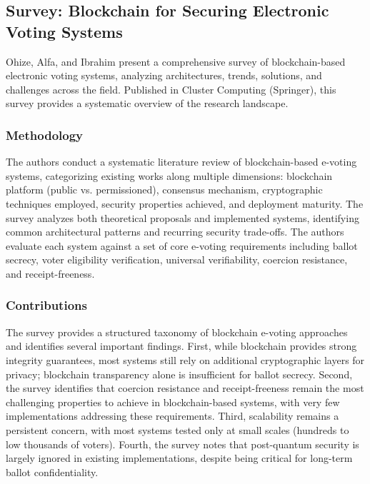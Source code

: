 \subsection{Survey: Blockchain for Securing Electronic Voting Systems}
\label{subsec:survey}

Ohize, Alfa, and Ibrahim \cite{evoting_survey_springer} present a comprehensive survey of blockchain-based electronic voting systems, analyzing architectures, trends, solutions, and challenges across the field. Published in Cluster Computing (Springer), this survey provides a systematic overview of the research landscape.

\subsubsection{Methodology}
\label{subsubsec:survey-method}

The authors conduct a systematic literature review of blockchain-based e-voting systems, categorizing existing works along multiple dimensions: blockchain platform (public vs. permissioned), consensus mechanism, cryptographic techniques employed, security properties achieved, and deployment maturity. The survey analyzes both theoretical proposals and implemented systems, identifying common architectural patterns and recurring security trade-offs. The authors evaluate each system against a set of core e-voting requirements including ballot secrecy, voter eligibility verification, universal verifiability, coercion resistance, and receipt-freeness.

\subsubsection{Contributions}
\label{subsubsec:survey-contrib}

The survey provides a structured taxonomy of blockchain e-voting approaches and identifies several important findings. First, while blockchain provides strong integrity guarantees, most systems still rely on additional cryptographic layers for privacy; blockchain transparency alone is insufficient for ballot secrecy. Second, the survey identifies that coercion resistance and receipt-freeness remain the most challenging properties to achieve in blockchain-based systems, with very few implementations addressing these requirements. Third, scalability remains a persistent concern, with most systems tested only at small scales (hundreds to low thousands of voters). Fourth, the survey notes that post-quantum security is largely ignored in existing implementations, despite being critical for long-term ballot confidentiality.

